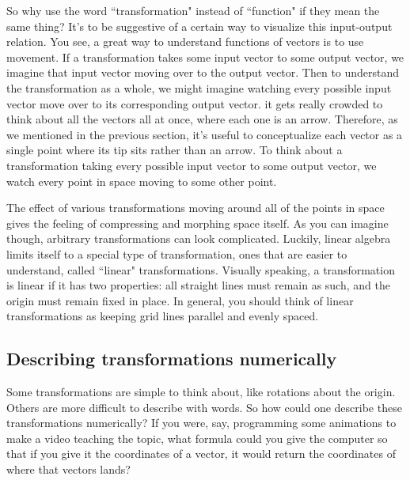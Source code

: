 So why use the word ``transformation" instead of ``function" if they mean the
same thing? It's to be suggestive of a certain way to visualize this
input-output relation. You see, a great way to understand functions of vectors
is to use movement. If a transformation takes some input vector to some output
vector, we imagine that input vector moving over to the output vector. Then to
understand the transformation as a whole, we might imagine watching every
possible input vector move over to its corresponding output vector. it gets
really crowded to think about all the vectors all at once, where each one is an
arrow. Therefore, as we mentioned in the previous section, it's useful to
conceptualize each vector as a single point where its tip sits rather than an
arrow. To think about a transformation taking every possible input vector to
some output vector, we watch every point in space moving to some other point.

The effect of various transformations moving around all of the points in space
gives the feeling of compressing and morphing space itself. As you can imagine
though, arbitrary transformations can look complicated. Luckily, linear algebra
limits itself to a special type of transformation, ones that are easier to
understand, called ``linear" transformations. Visually speaking, a
transformation is linear if it has two properties: all straight lines must
remain as such, and the origin must remain fixed in place. In general, you
should think of linear transformations as keeping grid lines parallel and evenly
spaced.

\subsection{Describing transformations numerically}

Some transformations are simple to think about, like rotations about the origin.
Others are more difficult to describe with words. So how could one describe
these transformations numerically? If you were, say, programming some animations
to make a video teaching the topic, what formula could you give the computer so
that if you give it the coordinates of a vector, it would return the coordinates
of where that vectors lands?

\begin{bookfigure}
\end{bookfigure}

